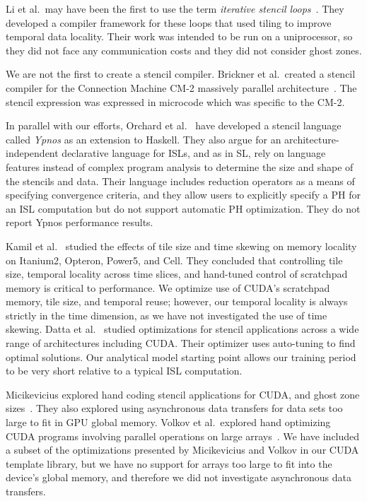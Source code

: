 \documentclass{sig-alternate}
\begin{document}
Li et al.\ may have been the first to use the term {\em iterative stencil
  loops}~\cite{li}.  They developed a compiler framework for these loops that
used tiling to improve temporal data locality.  Their work was intended to be
run on a uniprocessor, so they did not face any communication costs and they
did not consider ghost zones.

We are not the first to create a stencil compiler.  Brickner et al.\ created
a stencil compiler for the Connection Machine CM-2 massively parallel
architecture~\cite{cm2}.  The stencil expression was expressed in microcode
which was specific to the CM-2.

In parallel with our efforts, Orchard et al.~\cite{ypnos} have developed a
stencil language called {\em Ypnos} as an extension to Haskell.  They also
argue for an architecture-independent declarative language for ISLs, and as
in SL, rely on language features instead of complex program analysis to
determine the size and shape of the stencils and data.  Their language
includes reduction operators as a means of specifying convergence criteria,
and they allow users to explicitly specify a PH for an ISL computation but do
not support automatic PH optimization.  They do not report Ypnos performance
results.

Kamil et al.~\cite{kamil} studied the effects of tile size and time skewing
on memory locality on Itanium2, Opteron, Power5, and Cell.  They concluded
that controlling tile size, temporal locality across time slices, and
hand-tuned control of scratchpad memory is critical to performance.  We
optimize use of CUDA's scratchpad memory, tile size, and temporal reuse;
however, our temporal locality is always strictly in the time dimension, as
we have not investigated the use of time skewing.  Datta et
al.~\cite{AutoTuning} studied optimizations for stencil applications across a
wide range of architectures including CUDA.  Their optimizer uses auto-tuning
to find optimal solutions.  Our analytical model starting point allows our
training period to be very short relative to a typical ISL computation.

Micikevicius explored hand coding stencil applications for CU\-DA, and ghost
zone sizes~\cite{Micikevicius}.  They also explored using asynchronous data
transfers for data sets too large to fit in GPU global memory.  Volkov et
al.\ explored hand optimizing CUDA programs involving parallel operations on
large arrays~\cite{volkov}.  We have included a subset of the optimizations
presented by Micikevicius and Volkov in our CUDA template library, but we
have no support for arrays too large to fit into the device's global memory,
and therefore we did not investigate asynchronous data transfers.
\end{document}
